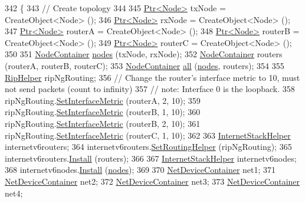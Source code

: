\begin{DoxyCode}
342 \{
343   \textcolor{comment}{// Create topology}
344 
345   \hyperlink{classns3_1_1Ptr}{Ptr<Node>} txNode = CreateObject<Node> ();
346   \hyperlink{classns3_1_1Ptr}{Ptr<Node>} rxNode = CreateObject<Node> ();
347   \hyperlink{classns3_1_1Ptr}{Ptr<Node>} routerA = CreateObject<Node> ();
348   \hyperlink{classns3_1_1Ptr}{Ptr<Node>} routerB = CreateObject<Node> ();
349   \hyperlink{classns3_1_1Ptr}{Ptr<Node>} routerC = CreateObject<Node> ();
350 
351   \hyperlink{classns3_1_1NodeContainer}{NodeContainer} \hyperlink{visualizer-ideas_8txt_a3e1b3808014a2c68ab0cd0182e041be2}{nodes} (txNode, rxNode);
352   \hyperlink{classns3_1_1NodeContainer}{NodeContainer} routers (routerA, routerB, routerC);
353   \hyperlink{classns3_1_1NodeContainer}{NodeContainer} \hyperlink{buildings__pathloss_8m_a00a349297fa58bc80ff5329e25dcfe28}{all} (\hyperlink{visualizer-ideas_8txt_a3e1b3808014a2c68ab0cd0182e041be2}{nodes}, routers);
354 
355   \hyperlink{classns3_1_1RipHelper}{RipHelper} ripNgRouting;
356   \textcolor{comment}{// Change the router's interface metric to 10, must not send packets (count to infinity)}
357   \textcolor{comment}{// note: Interface 0 is the loopback.}
358   ripNgRouting.\hyperlink{classns3_1_1RipHelper_ac04882a6293036d9cc97139f54c6c889}{SetInterfaceMetric} (routerA, 2, 10);
359   ripNgRouting.\hyperlink{classns3_1_1RipHelper_ac04882a6293036d9cc97139f54c6c889}{SetInterfaceMetric} (routerB, 1, 10);
360   ripNgRouting.\hyperlink{classns3_1_1RipHelper_ac04882a6293036d9cc97139f54c6c889}{SetInterfaceMetric} (routerB, 2, 10);
361   ripNgRouting.\hyperlink{classns3_1_1RipHelper_ac04882a6293036d9cc97139f54c6c889}{SetInterfaceMetric} (routerC, 1, 10);
362 
363   \hyperlink{classns3_1_1InternetStackHelper}{InternetStackHelper} internetv6routers;
364   internetv6routers.\hyperlink{classns3_1_1InternetStackHelper_a3e382c02df022dec79952a7eca8cd5ba}{SetRoutingHelper} (ripNgRouting);
365   internetv6routers.\hyperlink{classns3_1_1InternetStackHelper_a6645b412f31283d2d9bc3d8a95cebbc0}{Install} (routers);
366 
367   \hyperlink{classns3_1_1InternetStackHelper}{InternetStackHelper} internetv6nodes;
368   internetv6nodes.\hyperlink{classns3_1_1InternetStackHelper_a6645b412f31283d2d9bc3d8a95cebbc0}{Install} (\hyperlink{visualizer-ideas_8txt_a3e1b3808014a2c68ab0cd0182e041be2}{nodes});
369 
370   \hyperlink{classns3_1_1NetDeviceContainer}{NetDeviceContainer} net1;
371   \hyperlink{classns3_1_1NetDeviceContainer}{NetDeviceContainer} net2;
372   \hyperlink{classns3_1_1NetDeviceContainer}{NetDeviceContainer} net3;
373   \hyperlink{classns3_1_1NetDeviceContainer}{NetDeviceContainer} net4;

\end{DoxyCode}
